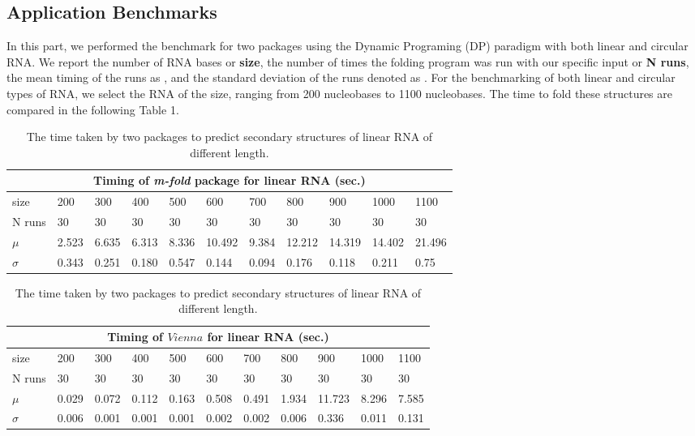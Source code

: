 \documentclass[12pt]{article}
\begin{document}
\subsection{Application Benchmarks}
\par In this part, we performed the benchmark for two packages using the Dynamic Programing (DP) paradigm with
both linear and circular RNA. We report the number of RNA bases or \textbf{size}, the number of times the folding
program was run with our specific input or \textbf{N runs}, the mean timing of the runs as \boldsymbol{$\mu$}, and the standard deviation of the
runs denoted as \boldsymbol{$\sigma$}. For the benchmarking of both linear and circular types of RNA, we select the RNA of the size,
ranging from 200 nucleobases to 1100 nucleobases. The time to fold these structures are compared in the following Table 1.
\begin{table}[h!]
    \begin{tabular}{ |p{1.5cm}||p{1.05cm}|p{1.05cm}|p{1.05cm}|p{1.05cm}|p{1.05cm}|p{1.05cm}|p{1.05cm}| p{1.05cm} | p{1.05cm} | p{1.05cm}| }
    \hline
    \multicolumn{11}{|c|}{Timing of \textit{m-fold} package for linear RNA (sec.)} \\
    \hline
    size& 200& 300& 400& 500& 600& 700 & 800 & 900 & 1000 & 1100\\
    \hline
    N runs& 30 & 30& 30 & 30& 30& 30& 30& 30& 30 & 30\\
    \hline
    $\mu$& 2.523 & 6.635 & 6.313 & 8.336 & 10.492 & 9.384 & 12.212 & 14.319 & 14.402 & 21.496\\
    $\sigma$ &0.343 & 0.251 & 0.180 & 0.547 & 0.144 & 0.094 & 0.176 & 0.118 & 0.211 & 0.75 \\
    \hline
    \end{tabular}

    \begin{tabular}{ |p{1.5cm}||p{1.05cm}|p{1.05cm}|p{1.05cm}|p{1.05cm}|p{1.05cm}|p{1.05cm}|p{1.05cm}| p{1.05cm} | p{1.05cm} | p{1.05cm} | }
    \hline
    \multicolumn{11}{|c|}{Timing of $Vienna$ for linear RNA (sec.)} \\
    \hline
    size& 200& 300& 400& 500& 600& 700 & 800 & 900 & 1000 & 1100\\
    \hline
    N runs& 30 & 30& 30 & 30& 30& 30& 30& 30& 30 & 30\\
    \hline
    $\mu$& 0.029 & 0.072 & 0.112 & 0.163 & 0.508 & 0.491 & 1.934 & 11.723 & 8.296 & 7.585 \\
    $\sigma$ &0.006 & 0.001 & 0.001 & 0.001 & 0.002 & 0.002 & 0.006 & 0.336 & 0.011 & 0.131 \\
    \hline
    \end{tabular}
\caption{The time taken by two packages to predict secondary structures of linear RNA of different length.}
\end{table}
\end{document}
